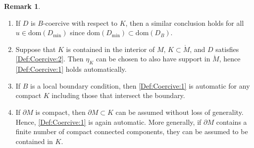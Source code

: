 \documentclass[a4paper,10pt,reqno]{amsart}
\newcommand{\interior}[1]{\mathring{#1}}
\newcommand{\dom}{\mathrm{dom}}
\newcommand{\dM}{\partial M}
\theoremstyle{definition}
\newtheorem{remark}[theorem]{Remark}
\begin{document}
\begin{remark}
\begin{enumerate}[label=(\alph*), wide, labelwidth=0pt, labelindent=0pt]
\item
      If $D$ is $B$-coercive with respect to $K$, then a similar conclusion holds for all $u \in \dom(D_{\min})$ since $\dom(D_{\min}) \subset \dom(D_B)$.
\item
      Suppose that $K$ is contained in the interior of $M$, $K \subset \interior{M}$, and $D$ satisfies \ref{Def:Coercive:2}.
      Then $\eta_K$ can be chosen to also have support in $\interior{M}$, hence \ref{Def:Coercive:1} holds automatically.
\item
      If $B$ is a local boundary condition, then \ref{Def:Coercive:1} is automatic for any compact $K$ including those that intersect the boundary.
\item
      If $\dM$ is compact, then $\dM\subset K$ can be assumed without loss of generality.
      Hence, \ref{Def:Coercive:1} is again automatic.
      More generally, if $\dM$ contains a finite number of compact connected components, they can be assumed to be contained in $K$.
\end{enumerate}
\end{remark}
\end{document}
